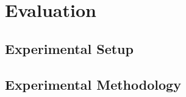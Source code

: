 \section{Evaluation} \label{sec:evaluation}

\subsection{Experimental Setup}


\subsection{Experimental Methodology}

